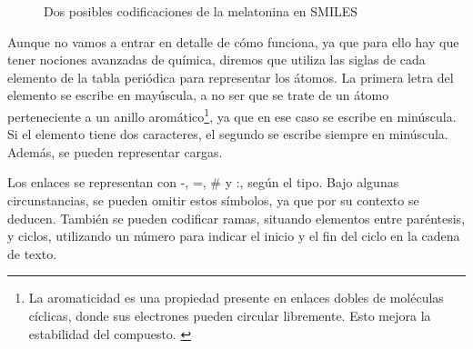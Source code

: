 \begin{figure}[H]
\centering
    \caption{Dos posibles codificaciones de la melatonina en SMILES \cite{smiles_wikipedia}}
\end{figure}

Aunque no vamos a entrar en detalle de cómo funciona, ya que para ello hay que tener nociones avanzadas de química, diremos que utiliza las siglas de cada elemento de la tabla periódica para representar los átomos. La primera letra del elemento se escribe en mayúscula, a no ser que se trate de un átomo perteneciente a un anillo aromático\footnote{La aromaticidad es una propiedad presente en enlaces dobles de moléculas cíclicas, donde sus electrones pueden circular libremente. Esto mejora la estabilidad del compuesto. \cite{aromaticidad, aromaticidad_wikipedia}}, ya que en ese caso se escribe en minúscula. Si el elemento tiene dos caracteres, el segundo se escribe siempre en minúscula. Además, se pueden representar cargas.

Los enlaces se representan con -, =, \# y :, según el tipo. Bajo algunas circunstancias, se pueden omitir estos símbolos, ya que por su contexto se deducen. También se pueden codificar ramas, situando elementos entre paréntesis, y ciclos, utilizando un número para indicar el inicio y el fin del ciclo en la cadena de texto. \cite{weininger1988smiles}

